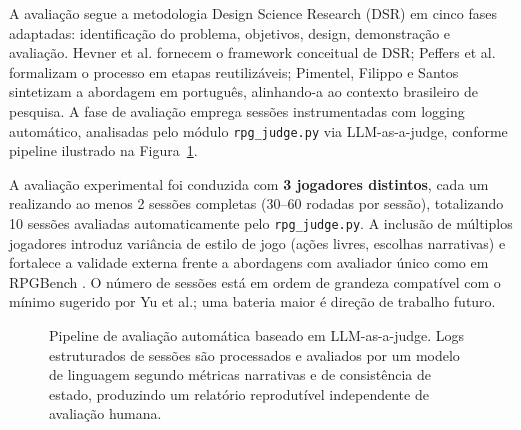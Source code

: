 \documentclass[12pt]{article}
\begin{document}
A avaliação segue a metodologia Design Science Research (DSR) \cite{hevner:2004,peffers:2007,pimentel:2020} em cinco fases adaptadas: identificação do problema, objetivos, design, demonstração e avaliação. Hevner et al. \cite{hevner:2004} fornecem o framework conceitual de DSR; Peffers et al. \cite{peffers:2007} formalizam o processo em etapas reutilizáveis; Pimentel, Filippo e Santos \cite{pimentel:2020} sintetizam a abordagem em português, alinhando-a ao contexto brasileiro de pesquisa. A fase de avaliação emprega sessões instrumentadas com logging automático, analisadas pelo módulo \texttt{rpg\_judge.py} via LLM-as-a-judge, conforme pipeline ilustrado na Figura~\ref{fig:pipeline}.

A avaliação experimental foi conduzida com \textbf{3 jogadores distintos}, cada um realizando ao menos 2 sessões completas (30--60 rodadas por sessão), totalizando 10 sessões avaliadas automaticamente pelo \texttt{rpg\_judge.py}. A inclusão de múltiplos jogadores introduz variância de estilo de jogo (ações livres, escolhas narrativas) e fortalece a validade externa frente a abordagens com avaliador único como em RPGBench \cite{yu:2025}. O número de sessões está em ordem de grandeza compatível com o mínimo sugerido por Yu et al.; uma bateria maior é direção de trabalho futuro.

\begin{figure}[ht]
\centering
{}
\caption{Pipeline de avaliação automática baseado em LLM-as-a-judge. Logs estruturados de sessões são processados e avaliados por um modelo de linguagem segundo métricas narrativas e de consistência de estado, produzindo um relatório reprodutível independente de avaliação humana.}
\label{fig:pipeline}
\end{figure}
\end{document}
